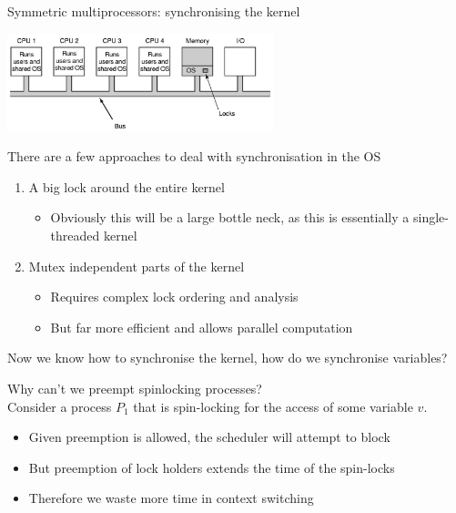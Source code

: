 \documentclass[journal, letterpaper]{IEEEtran}
\begin{document}
\begin{example}{Symmetric multiprocessors: synchronising the kernel}
    \begin{center}
        \includegraphics[width=7.75cm]{./photos/smp.png}
    \end{center}
    There are a few approaches to deal with synchronisation in the OS
    \begin{enumerate}
        \item A big lock around the entire kernel
        \begin{itemize}
            \item Obviously this will be a large bottle neck, as this is essentially a single-threaded kernel
        \end{itemize}
        \item Mutex independent parts of the kernel
        \begin{itemize}
            \item Requires complex lock ordering and analysis
            \item But far more efficient and allows parallel computation
        \end{itemize}
    \end{enumerate}
\end{example}
Now we know how to synchronise the kernel, how do we synchronise variables?
\begin{example}{Why can't we preempt spinlocking processes?} \\
    Consider a process $P_1$ that is spin-locking for the access of some variable $v$.
    \begin{itemize}
        \item Given preemption is allowed, the scheduler will attempt to block
        \item But preemption of lock holders extends the time of the spin-locks
        \item Therefore we waste more time in context switching
    \end{itemize}
    
\end{example}
\end{document}
